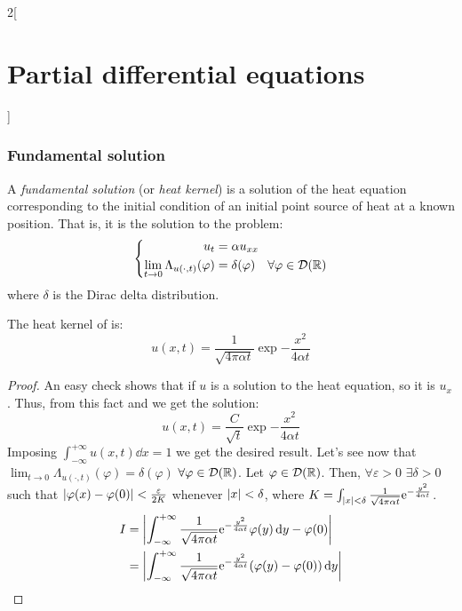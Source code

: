 \documentclass[../../../main_math.tex]{subfiles}
\begin{document}
\begin{multicols}{2}[\section{Partial differential equations}]
  \subsubsection{Fundamental solution}
  \begin{definition}
    A \emph{fundamental solution} (or \emph{heat kernel}) is a solution of the heat equation corresponding to the initial condition of an initial point source of heat at a known position. That is, it is the solution to the problem:
    \begin{equation}\label{PDE:fundamental}
      \left\{
      \begin{aligned}
        u_{t}                                       & =\alpha u_{xx}                                          \\
        \lim_{t\to 0} \Lambda_{u(\cdot,t)}(\varphi) & = \delta(\varphi)\quad\forall\varphi\in\mathcal{D}(\mathbb{R})
      \end{aligned}
      \right.
    \end{equation}
    where $\delta$ is the Dirac delta distribution.
  \end{definition}
  \begin{theorem}\label{PDE:heatkernelprop}
    The heat kernel of  is:
    \begin{equation}\label{PDE:heatkernel}
      u(x,t)=\frac{1}{\sqrt{4\pi\alpha t}}\exp{-\frac{x^2}{4\alpha t}}
    \end{equation}
  \end{theorem}
  \begin{proof}
    An easy check shows that if $u$ is a solution to the heat equation, so it is $u_x$. Thus, from this fact and  we get the solution:
    $$u(x,t)=\frac{C}{\sqrt{t}}\exp{-\frac{x^2}{4\alpha t}}$$
    Imposing $\int_{-\infty}^{+\infty}u(x,t)\dd{x}=1$ we get the desired result. Let's see now that $\displaystyle \lim_{t\to 0} \Lambda_{u(\cdot,t)}(\varphi) = \delta(\varphi)$ $\forall\varphi\in\mathcal{D}(\mathbb{R})$. Let $\varphi\in\mathcal{D}(\mathbb{R})$. Then, $\forall \varepsilon>0$ $\exists\delta>0$ such that $\abs{\varphi(x)-\varphi(0)}<\frac{\varepsilon}{2K}$ whenever $\abs{x}<\delta$, where $K=\int_{\abs{x}<\delta}\frac{1}{\sqrt{4\pi\alpha t}}\mathrm{e}^{-\frac{y^2}{4\alpha t}}$.
    \begin{align*}
      I & =\abs{\int_{-\infty}^{+\infty}\frac{1}{\sqrt{4\pi\alpha t}}\exp{-\frac{y^2}{4\alpha t}}\varphi(y)\dd{y}-\varphi(0)}    \\
        & = \abs{\int_{-\infty}^{+\infty}\frac{1}{\sqrt{4\pi\alpha t}}\exp{-\frac{y^2}{4\alpha t}}(\varphi(y)-\varphi(0))\dd{y}} \\

\end{align*}
\end{proof}
\end{multicols}
\end{document}
